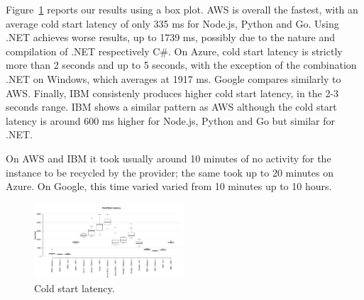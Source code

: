 Figure~\ref{fig:coldstart_plot} reports our results using a box plot.
 \gls{AWS} is overall the fastest, with an average cold start latency of only 335 ms for Node.js, Python and Go. 
Using .NET achieves worse results, up to 1739 ms, possibly due to the nature and compilation of .NET respectively C\#. 
On Azure, cold start latency is strictly more than 2 seconds and up to 5 seconds, with the exception of the combination .NET on Windows, which averages at 1917 ms. 
Google compares similarly to \gls{AWS}.
Finally, \gls{IBM} consistenly produces  higher cold start latency, in the 2-3 seconds range. 
\gls{IBM} shows a similar pattern  as \gls{AWS} although the cold start latency is around 600 ms higher for Node.js, Python and Go but similar for .NET.

On \gls{AWS} and \gls{IBM} it took usually around 10 minutes of no activity for the instance to be recycled by the provider; the same took up to 20 minutes on Azure. 
On Google, this time varied varied from 10 minutes up to 10 hours.

\begin{figure}[!t]
\begin{center}
\includegraphics[width=0.5\textwidth]{bilder/cold_start/boxplot_coldstart_all.pdf}
\caption{Cold start latency.}
\label{fig:coldstart_plot}
\end{center}
\end{figure}



